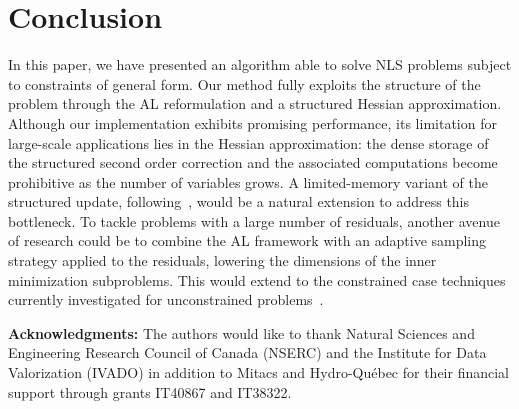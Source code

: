 \section*{Conclusion}
In this paper, we have presented an algorithm able to solve NLS problems subject to constraints of general form. Our method fully exploits the structure of the problem through the AL reformulation and a structured Hessian approximation. 
Although our implementation exhibits promising performance, its limitation for large-scale applications lies in the Hessian approximation: the dense storage of the structured second order correction and the associated computations become prohibitive as the number of variables grows. A limited-memory variant of the structured update, following~\cite{byrd-etal:1994}, would be a natural extension to address this bottleneck. To tackle problems with a large number of residuals, another avenue of research could be to combine the AL framework with an adaptive sampling strategy applied to the residuals, lowering the dimensions of the inner minimization subproblems. This would extend to the constrained case techniques currently investigated for unconstrained problems~\cite{bellavia-etal:2026}.

\vspace{1em}\noindent\textbf{Acknowledgments:} The authors would like to thank Natural Sciences and Engineering Research Council of Canada (NSERC) and the Institute for Data Valorization (IVADO) in addition to Mitacs and  Hydro-Québec for their financial support through grants IT40867 and IT38322.
